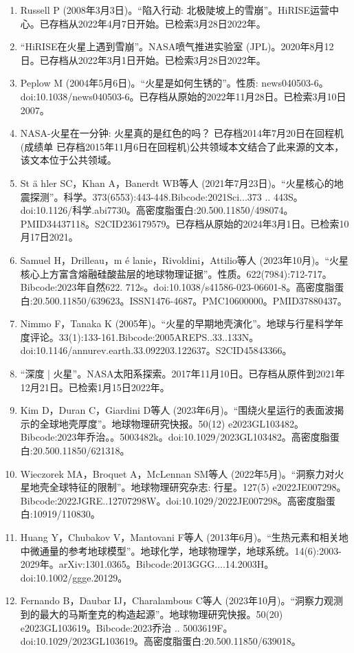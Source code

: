 \begin{enumerate}
\item Russell P (2008年3月3日)。“陷入行动: 北极陡坡上的雪崩”。HiRISE运营中心。已存档从2022年4月7日开始。已检索3月28日2022年。
\item “HiRISE在火星上遇到雪崩”。NASA喷气推进实验室 (JPL)。2020年8月12日。已存档从2022年3月1日开始。已检索3月28日2022年。
\item Peplow M (2004年5月6日)。“火星是如何生锈的”。性质: news040503-6。doi:10.1038/news040503-6。已存档从原始的2022年11月28日。已检索3月10日2007。
\item NASA-火星在一分钟: 火星真的是红色的吗？ 已存档2014年7月20日在回程机(成绩单 已存档2015年11月6日在回程机)公共领域本文结合了此来源的文本，该文本位于公共领域。
\item St ä hler SC，Khan A，Banerdt WB等人 (2021年7月23日)。“火星核心的地震探测”。科学。373(6553):443-448.Bibcode:2021Sci...373 .. 443S。doi:10.1126/科学.abi7730。高密度脂蛋白:20.500.11850/498074。PMID34437118。S2CID236179579。已存档从原始的2024年3月1日。已检索10月17日2021。   
\item Samuel H，Drilleau，m é lanie，Rivoldini，Attilio等人 (2023年10月)。“火星核心上方富含熔融硅酸盐层的地球物理证据”。性质。622(7984):712-717。Bibcode:2023年自然622. 712s。doi:10.1038/s41586-023-06601-8。高密度脂蛋白:20.500.11850/639623。ISSN1476-4687。PMC10600000。PMID37880437。    
\item Nimmo F，Tanaka K (2005年)。“火星的早期地壳演化”。地球与行星科学年度评论。33(1):133-161.Bibcode:2005AREPS..33..133N。doi:10.1146/annurev.earth.33.092203.122637。S2CID45843366。 
\item “深度 | 火星”。NASA太阳系探索。2017年11月10日。已存档从原件到2021年12月21日。已检索1月15日2022年。
\item Kim D，Duran C，Giardini D等人 (2023年6月)。“围绕火星运行的表面波揭示的全球地壳厚度”。地球物理研究快报。50(12) e2023GL103482。Bibcode:2023年乔治。。5003482k。doi:10.1029/2023GL103482。高密度脂蛋白:20.500.11850/621318。
\item Wieczorek MA，Broquet A，McLennan SM等人 (2022年5月)。“洞察力对火星地壳全球特征的限制”。地球物理研究杂志: 行星。127(5) e2022JE007298。Bibcode:2022JGRE..12707298W。doi:10.1029/2022JE007298。高密度脂蛋白:10919/110830。
\item Huang Y，Chubakov V，Mantovani F等人 (2013年6月)。“生热元素和相关地中微通量的参考地球模型”。地球化学，地球物理学，地球系统。14(6):2003-2029年。arXiv:1301.0365。Bibcode:2013GGG....14.2003H。doi:10.1002/ggge.20129。
\item Fernando B，Daubar IJ，Charalambous C等人 (2023年10月)。“洞察力观测到的最大的马斯奎克的构造起源”。地球物理研究快报。50(20) e2023GL103619。Bibcode:2023乔治 .. 5003619F。doi:10.1029/2023GL103619。高密度脂蛋白:20.500.11850/639018。

\end{enumerate}

